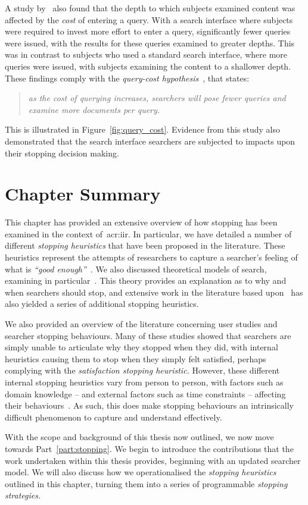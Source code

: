 A study by~\cite{azzopardi2013query_cost} also found that the depth to which subjects examined content was affected by the \emph{cost} of entering a query. With a search interface where subjects were required to invest more effort to enter a query, significantly fewer queries were issued, with the results for these queries examined to greater depths. This was in contrast to subjects who used a standard search interface, where more queries were issued, with subjects examining the content to a shallower depth. These findings comply with the \emph{query-cost hypothesis}~\citep{azzopardi2011economics}, that states:

\begin{quote}
    \emph{as the cost of querying increases, searchers will pose fewer queries and examine more documents per query.}
\end{quote}

This is illustrated in Figure~\ref{fig:query_cost}. Evidence from this study also demonstrated that the search interface searchers are subjected to impacts upon their stopping decision making.

\section{Chapter Summary}
This chapter has provided an extensive overview of how stopping has been examined in the context of~\gls{acr:iir}. In particular, we have detailed a number of different \emph{stopping heuristics} that have been proposed in the literature. These heuristics represent the attempts of researchers to capture a searcher's feeling of what is \emph{``good enough''}~\citep{zach2005enough_is_enough}. We also discussed theoretical models of search, examining in particular~. This theory provides an explanation as to why and when searchers should stop, and extensive work in the literature based upon~ has also yielded a series of additional stopping heuristics.

We also provided an overview of the literature concerning user studies and searcher stopping behaviours. Many of these studies showed that searchers are simply unable to articulate why they stopped when they did, with internal heuristics causing them to stop when they simply felt satisfied, perhaps complying with the \emph{satisfaction stopping heuristic.} However, these different internal stopping heuristics vary from person to person, with factors such as domain knowledge -- and external factors such as time constraints -- affecting their behaviours~\citep{marchionini1995information_seeking}. As such, this does make stopping behaviours an intrinsically difficult phenomenon to capture and understand effectively.

With the scope and background of this thesis now outlined, we now move towards Part~\ref{part:stopping}. We begin to introduce the contributions that the work undertaken within this thesis provides, beginning with an updated searcher model. We will also discuss how we operationalised the \emph{stopping heuristics} outlined in this chapter, turning them into a series of programmable \emph{stopping strategies.}
